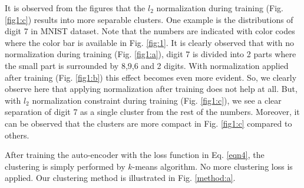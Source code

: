 \documentclass[conference]{IEEEtran}
\begin{document}
It is observed from the figures that the $l_2$ normalization during training (Fig. \ref{fig1:c}) results into more separable clusters. One example is the distributions of digit 7 in MNIST dataset. Note that the numbers are indicated with color codes where the color bar is available in Fig. \ref{fig:1}. It is clearly observed that with no normalization during training (Fig. \ref{fig1:a}), digit 7 is divided into 2 parts where the small part is surrounded by 8,9,6 and 2 digits. With normalization applied after training (Fig. \ref{fig1:b}) this effect becomes even more evident. So, we clearly observe here that applying normalization after training does not help at all. But, with $l_2$ normalization constraint during training (Fig. \ref{fig1:c}), we see a clear separation of digit 7 as a single cluster from the rest of the numbers. Moreover, it can be observed that the clusters are more compact in Fig. \ref{fig1:c} compared to others.


After training the auto-encoder with the loss function in Eq. \ref{eqn4}, the clustering is simply performed by $k$-means algorithm. No more clustering loss is applied. Our clustering method is illustrated in Fig. \ref{method:a}.



\end{document}
